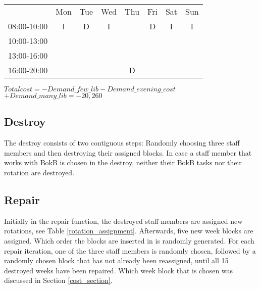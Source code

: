 \begin{table}[!h]
\begin{tabular}{cccccccc}
                                 & Mon                                             & Tue                    & Wed                                            & Thu                    & Fri                                            & Sat                    & Sun                    \\ \cline{2-8} 
\multicolumn{1}{c|}{08:00-10:00} & \multicolumn{1}{c|}{I} & \multicolumn{1}{c|}{\cellcolor[HTML]{FCFF2F}D} & \multicolumn{1}{c|}{I} & \multicolumn{1}{c|}{} & \multicolumn{1}{c|}{\cellcolor[HTML]{FCFF2F}D} & \multicolumn{1}{c|}{I} & \multicolumn{1}{c|}{I} \\ \cline{2-8} 
\multicolumn{1}{c|}{10:00-13:00} & \multicolumn{1}{c|}{}   & \multicolumn{1}{c|}{}  & \multicolumn{1}{c|}{} & \multicolumn{1}{c|}{}  & \multicolumn{1}{c|}{} &     &   \\ \cline{2-6}
\multicolumn{1}{c|}{13:00-16:00} & \multicolumn{1}{c|}{}   & \multicolumn{1}{c|}{}  & \multicolumn{1}{c|}{} & \multicolumn{1}{c|}{}  & \multicolumn{1}{c|}{}         &            &          \\ \cline{2-6}
\multicolumn{1}{c|}{16:00-20:00} & \multicolumn{1}{c|}{}  & \multicolumn{1}{c|}{}  & \multicolumn{1}{c|}{} & \multicolumn{1}{c|}{\cellcolor[HTML]{FCFF2F}D}  & \multicolumn{1}{c|}{} &         &         \\ \cline{2-6}
\end{tabular} 
\newline
$Total cost = -Demand\_few\_lib - Demand\_evening\_cost$
$+ Demand\_many\_lib = -20,260$

\end{table}



\subsection{Destroy}
The destroy consists of two contiguous steps: Randomly choosing three staff members and then destroying their assigned blocks. In case a staff member that works with BokB is chosen in the destroy, neither their BokB tasks nor their rotation are destroyed. 

\subsection{Repair} \label{repair}
Initially in the repair function, the destroyed staff members are assigned new rotations, see Table \ref{rotation_assignment}. Afterwards, five new week blocks are assigned. Which order the blocks are inserted in is randomly generated. For each repair iteration, one of the three staff members is randomly chosen, followed by a randomly chosen block that has not already been reassigned, until all 15 destroyed weeks have been repaired. Which week block that is chosen was discussed in Section \ref{cost_section}.
